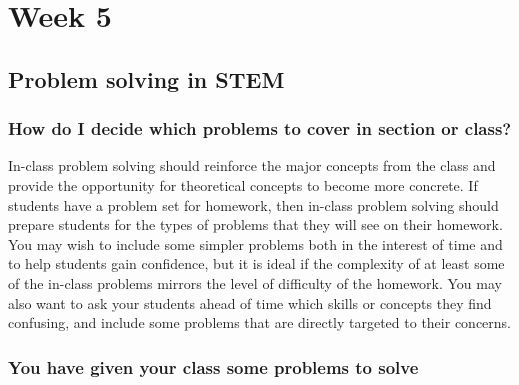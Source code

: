 
\section{Week 5}
\label{sec:week-5}

\subsection{Problem solving in STEM}
\label{sec:problem-solving-stem}

\subsubsection{How do I decide which problems to cover in section or class?}
\label{sec:how-do-i}

In-class problem solving should reinforce the major concepts from the class and provide the opportunity for theoretical concepts to become more concrete. If students have a problem set for homework, then in-class problem solving should prepare students for the types of problems that they will see on their homework. You may wish to include some simpler problems both in the interest of time and to help students gain confidence, but it is ideal if the complexity of at least some of the in-class problems mirrors the level of difficulty of the homework. You may also want to ask your students ahead of time which skills or concepts they find confusing, and include some problems that are directly targeted to their concerns.

\subsubsection{You have given your class some problems to solve}
\label{sec:you-have-given}

